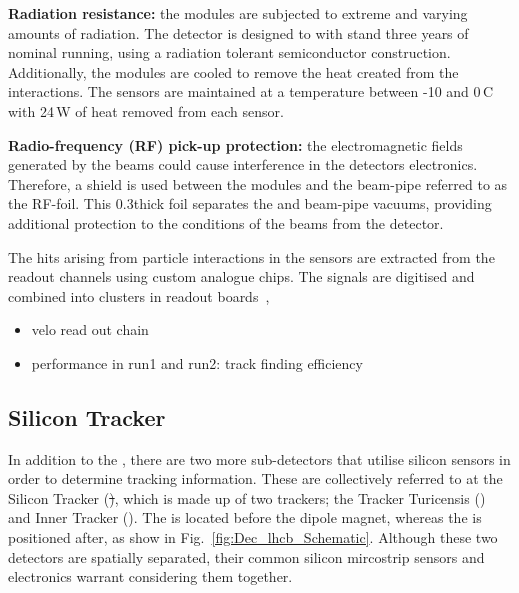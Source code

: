 \begin{description}   
\item \textbf{Radiation resistance:} the \velo modules are subjected to extreme and varying amounts of radiation. The detector is designed to with stand three years of nominal \lhc running, using a radiation tolerant semiconductor construction. Additionally, the \velo modules are cooled to remove the heat created from the interactions. The sensors are maintained at a temperature between -10 and 0\degrees\,C with 24\,W of heat removed from each sensor.  
\item \textbf{Radio-frequency (RF) pick-up protection:} the electromagnetic fields generated by the \lhc beams could cause interference in the \velo detectors electronics. Therefore, a shield is used between the modules and the beam-pipe referred to as the RF-foil. This 0.3\mm thick foil separates the \velo and beam-pipe vacuums, providing additional protection to the conditions of the beams from the detector.
\end{description}   

The hits arising from particle interactions in the \velo sensors are extracted from the readout channels using custom analogue \beetle chips. The signals are digitised and combined into clusters in  readout boards~\cite{HAEFELI2006494}, 


{\color{Red}
\begin{itemize}
\item velo read out chain
\item performance in run1 and run2: track finding efficiency 
\end{itemize}
}




\subsection{Silicon Tracker}

In addition to the \velo, there are two more sub-detectors that utilise silicon sensors in order to determine tracking information. These are collectively referred to at the Silicon Tracker (\st), which is made up of two trackers; the Tracker Turicensis (\ttracker) and Inner Tracker (\intr). The \ttracker is located before the dipole magnet, whereas the \intr is positioned after, as show in Fig.~\ref{fig:Dec_lhcb_Schematic}. Although these two detectors are spatially separated, their common silicon mircostrip sensors and electronics warrant considering them together.

